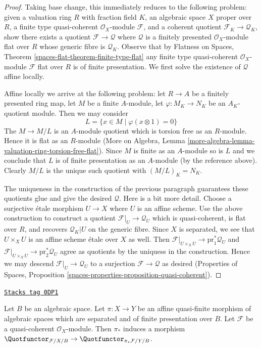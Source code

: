 \begin{proof}
Taking base change, this immediately reduces to the following
problem: given a valuation ring $R$ with fraction field $K$,
an algebraic space $X$ proper over $R$, a finite type quasi-coherent
$\mathcal{O}_X$-module $\mathcal{F}$, and a coherent
quotient $\mathcal{F}_K \to \mathcal{Q}_K$, show there exists
a quotient $\mathcal{F} \to \mathcal{Q}$ where $\mathcal{Q}$ is a
finitely presented $\mathcal{O}_X$-module
flat over $R$ whose generic fibre is $\mathcal{Q}_K$.
Observe that by Flatness on Spaces, Theorem
\ref{spaces-flat-theorem-finite-type-flat}
any finite type quasi-coherent $\mathcal{O}_X$-module
$\mathcal{F}$ flat over $R$ is of finite presentation.
We first solve the existence of $\mathcal{Q}$ affine locally.

\medskip\noindent
Affine locally we arrive at the following problem:
let $R \to A$ be a finitely presented ring map,
let $M$ be a finite $A$-module, let $\varphi : M_K \to N_K$ be
an $A_K$-quotient module. Then we may consider
$$
L = \{x \in M \mid \varphi(x \otimes 1) = 0 \}
$$
The $M \to M/L$ is an $A$-module quotient which is
torsion free as an $R$-module. Hence it is flat as an
$R$-module (More on Algebra, Lemma
\ref{more-algebra-lemma-valuation-ring-torsion-free-flat}).
Since $M$ is finite as an $A$-module so is $L$ and we
conclude that $L$ is of finite presentation as an $A$-module
(by the reference above). Clearly $M/L$ is the unique such
quotient with $(M/L)_K = N_K$.

\medskip\noindent
The uniqueness in the construction of the previous paragraph
guarantees these quotients glue and give the desired $\mathcal{Q}$.
Here is a bit more detail. Choose a surjective \'etale morphism
$U \to X$ where $U$ is an affine scheme. Use the above construction
to construct a quotient $\mathcal{F}|_U \to \mathcal{Q}_U$
which is quasi-coherent, is flat over $R$, and recovers $\mathcal{Q}_K|U$
on the generic fibre. Since $X$ is separated, we see that
$U \times_X U$ is an affine scheme \'etale over $X$ as well.
Then $\mathcal{F}|_{U \times_X U} \to \text{pr}_1^*\mathcal{Q}_U$ and
$\mathcal{F}|_{U \times_X U} \to \text{pr}_2^*\mathcal{Q}_U$
agree as quotients by the uniquess in the construction. Hence we may descend
$\mathcal{F}|_U \to \mathcal{Q}_U$ to a surjection
$\mathcal{F} \to \mathcal{Q}$ as desired (Properties of Spaces,
Proposition \ref{spaces-properties-proposition-quasi-coherent}).
\end{proof}

\begin{lemma}
\label{moduli-lemma-quot-functorial}
\href{https://stacks.math.columbia.edu/tag/0DP1}{\texttt{Stacks tag 0DP1}}

Let $B$ be an algebraic space. Let $\pi : X \to Y$ be an affine quasi-finite
morphism of algebraic spaces which are separated and of finite presentation
over $B$. Let $\mathcal{F}$ be a quasi-coherent $\mathcal{O}_X$-module.
Then $\pi_*$ induces a morphism
$\Quotfunctor_{\mathcal{F}/X/B} \to \Quotfunctor_{\pi_*\mathcal{F}/Y/B}$.
\end{lemma}

